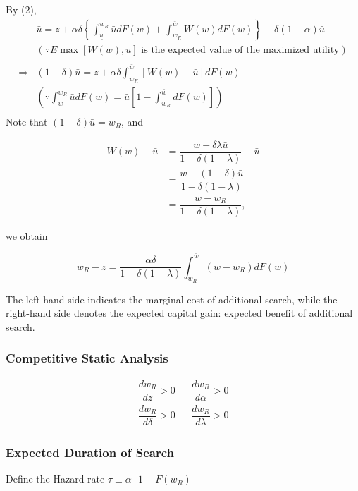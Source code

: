 \documentclass[dvipdfmx, 12pt]{article}
\begin{document}
By (2),
\begin{align*}
  &\bar{u} = z + \alpha \delta \left\{ \int_{\underline{w}}^{w_R} \bar{u}dF(w) + \int_{w_R}^{\bar{w}} W(w)dF(w) \right\} + \delta (1 - \alpha) \bar{u} \\
  & (\because E \max[W(w), \bar{u}] \text{ is the expected value of the maximized utility}) \\
  \\
  \Longrightarrow &(1 - \delta)\bar{u} = z + \alpha \delta \int_{w_R}^{\bar{w}}[W(w) - \bar{u}]dF(w) \\
  & \left(\because \int_{\underline{w}}^{w_R} \bar{u}dF(w) = \bar{u} \left[ 1 - \int_{w_R}^{\bar{w}} dF(w) \right] \right) \\
\end{align*}
Note that $(1 - \delta)\bar{u} = w_R$, and

\begin{align*}
  W(w) - \bar{u} &= \dfrac{w + \delta \lambda \bar{u}}{1 - \delta (1 - \lambda)} -\bar{u} \\
  &= \dfrac{w - (1 - \delta) \bar{u}}{1 - \delta(1 - \lambda)} \\
  &= \dfrac{w - w_R}{1 - \delta(1 - \lambda)},
\end{align*}

we obtain

\[
w_R - z = \dfrac{\alpha \delta}{1 - \delta(1- \lambda)} \int_{w_R}^{\bar{w}} (w - w_R) dF(w)
\]

The left-hand side indicates the marginal cost of additional search, while the right-hand side denotes the expected capital gain: expected benefit of additional search.

\subsubsection{Competitive Static Analysis}

\begin{align*}
  \dfrac{d w_R}{dz} > 0 & & \dfrac{d w_R}{d \alpha} >0 \\
  \dfrac{d w_R}{d \delta} > 0 & & \dfrac{d w_R}{d \lambda} >0
\end{align*}

\subsubsection{Expected Duration of Search}

Define the Hazard rate $\tau \equiv \alpha [1 - F(w_R)]$
\end{document}
